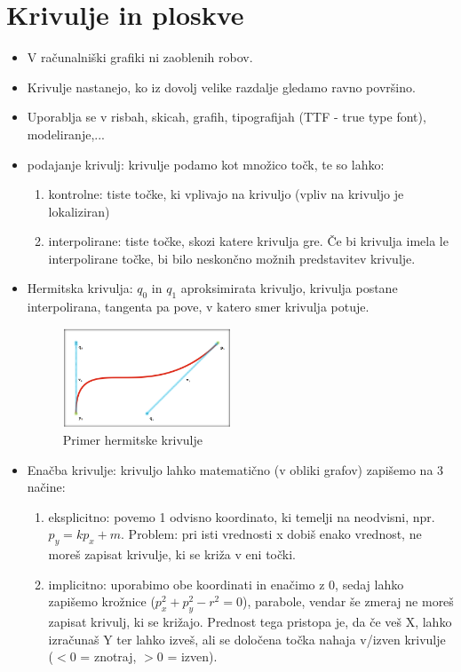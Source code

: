 \documentclass{article}
\begin{document}
\section{Krivulje in ploskve}
\begin{itemize}
    \item V računalniški grafiki ni zaoblenih robov.
    \item Krivulje nastanejo, ko iz dovolj velike razdalje gledamo ravno površino.
    \item Uporablja se v risbah, skicah, grafih, tipografijah (TTF - true type font), modeliranje,...
    \item podajanje krivulj: krivulje podamo kot množico točk, te so lahko:
    \begin{enumerate}
        \item kontrolne: tiste točke, ki vplivajo na krivuljo (vpliv na krivuljo je lokaliziran)
        \item interpolirane: tiste točke, skozi katere krivulja gre. Če bi krivulja imela le interpolirane točke, bi bilo neskončno možnih predstavitev krivulje.
    \end{enumerate}
    \item Hermitska krivulja: $q_0$ in $q_1$ aproksimirata krivuljo, krivulja postane interpolirana, tangenta pa pove, v katero smer krivulja potuje. 
        \begin{figure}[H]
        \centering
        \includegraphics[width=50mm]{src/hermitska_krivulja.png}
        \caption{Primer hermitske krivulje}
        \end{figure}    
    \item Enačba krivulje: krivuljo lahko matematično (v obliki grafov) zapišemo na 3 načine:
    \begin{enumerate}
        \item eksplicitno: povemo 1 odvisno koordinato, ki temelji na neodvisni, npr. $p_y = kp_x + m$. Problem: pri isti vrednosti x dobiš enako vrednost, ne moreš zapisat krivulje, ki se križa v eni točki. 
        \item implicitno: uporabimo obe koordinati in enačimo z 0, sedaj lahko zapišemo krožnice ($p_x^2 + p_y^2 - r^2 = 0$), parabole, vendar še zmeraj ne moreš zapisat krivulj, ki se križajo. Prednost tega pristopa je, da če veš X, lahko izračunaš Y ter lahko izveš, ali se določena točka nahaja v/izven krivulje ($< 0$ = znotraj, $ > 0$ = izven).

\end{enumerate}
\end{itemize}
\end{document}
